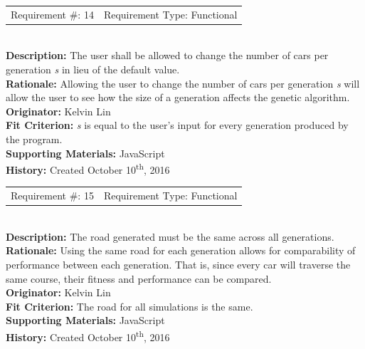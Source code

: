\documentclass[12pt, titlepage]{article}
\begin{document}
\begin{reqbox}
%
\begin{tabular}{cc}
Requirement \#: 14 & Requirement Type: Functional \\
\end{tabular} \\
%
\textbf{Description:} The user shall be allowed to change the number of cars per 
generation \textit{s} in lieu of the default value. \\
\textbf{Rationale:} Allowing the user to change the number of cars per 
generation \textit{s} will allow the user to see how the size of a generation 
affects the genetic algorithm. \\
\textbf{Originator:} Kelvin Lin\\
\textbf{Fit Criterion:} \textit{s} is equal to the user's input for every 
generation produced by the program.\\
%  
\textbf{Supporting Materials:} JavaScript \\
\textbf{History:} Created October 10\textsuperscript{th}, 2016
%
\end{reqbox}

\begin{reqbox}
%
\begin{tabular}{cc}
Requirement \#: 15 & Requirement Type: Functional \\
\end{tabular} \\
%
\textbf{Description:} The road generated must be the same across all 
generations. \\
\textbf{Rationale:} Using the same road for each generation allows for 
comparability of performance between each generation. That is, since every car 
will traverse the same course, their fitness and performance can be compared. \\
\textbf{Originator:} Kelvin Lin\\
\textbf{Fit Criterion:} The road for all simulations is the same. \\
%  
\textbf{Supporting Materials:} JavaScript \\
\textbf{History:} Created October 10\textsuperscript{th}, 2016
%
\end{reqbox}
\end{document}
